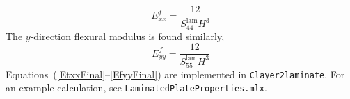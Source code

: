 \documentclass[11pt]{article}
\begin{document}
 \begin{equation}
     E^f_{xx} = \frac{12}{S^\mathrm{lam}_{44} H^3}
     \label{EfxxFinal}
\end{equation}
The $y$-direction flexural modulus is found similarly,
 \begin{equation}
     E^f_{yy} = \frac{12}{S^\mathrm{lam}_{55} H^3}
     \label{EfyyFinal}
\end{equation}
 Equations~(\ref{EtxxFinal}--\ref{EfyyFinal}) are implemented in \texttt{Clayer2laminate}.  
  For an example calculation, see \break \texttt{LaminatedPlateProperties.mlx}.
\end{document}
